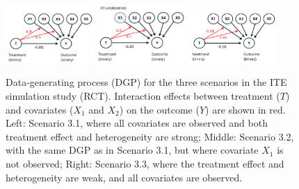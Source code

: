 \begin{figure}[H]
\centering
\includegraphics[width=0.3\textwidth]{img/results_ITE_simulation/simulation_observed.png}
\includegraphics[width=0.3\textwidth]{img/results_ITE_simulation/simulation_unobserved.png}
\includegraphics[width=0.3\textwidth]{img/results_ITE_simulation/simulation_small_effects.png}
\caption{Data-generating process (DGP) for the three scenarios in the ITE simulation study (RCT). Interaction effects between treatment ($T$) and covariates ($X_1$ and $X_2$) on the outcome ($Y$) are shown in red. Left: Scenario 3.1, where all covariates are observed and both treatment effect and heterogeneity are strong; Middle: Scenario 3.2, with the same DGP as in Scenario 3.1, but where covariate $X_1$ is not observed; Right: Scenario 3.3, where the treatment effect and heterogeneity are weak, and all covariates are observed.}
\label{fig:simulation_dags}
\end{figure}








